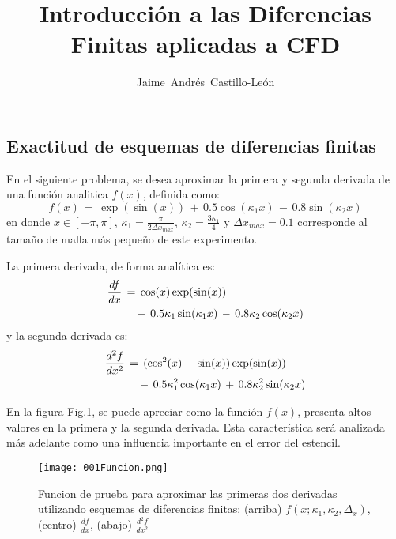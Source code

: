 \documentclass[9pt,technote,twoside,letterpaper,onecolumn]{IEEEtran}
\title{Introducción a las Diferencias Finitas aplicadas a CFD}
\author{Jaime~Andrés~Castillo-León}
\begin{document}
\begin{multicols}{2}
\maketitle



\section{Exactitud de esquemas de diferencias finitas}
\label{sec:exac}
En el siguiente problema, se desea aproximar la primera y segunda derivada de una función analitica $f(x)$,  definida como:
\begin{equation}
  f(x)\,=\,\exp(\sin(x))\,+\,0.5\cos(\kappa_1x)\,-\,0.8\sin(\kappa_2x)
  \label{eq:fun}
\end{equation}
en donde $x\in[-\pi,\pi]$, $\kappa_1 = \frac{\pi}{2\Delta x_{max}}$, $\kappa_2 = \frac{3\kappa_1}{4}$ y $\Delta x_{max}=0.1$ corresponde al tamaño de malla más pequeño de este experimento.

La primera derivada, de forma analítica es:
\begin{align}
  \frac{df}{dx}\,&=\,\cos(x)\exp(\sin(x))\notag\\
&\quad-\,0.5\kappa_1\sin(\kappa_1x)\,-\,0.8\kappa_2\cos(\kappa_2x)
  \label{eq:dfun}
\end{align}
y la segunda derivada es:
\begin{align}
  \frac{d^2f}{dx^2}\,&=\,(\cos^2(x)-\,\sin(x))\exp(\sin(x))\notag\\
&\quad-\,0.5\kappa^2_1\cos(\kappa_1x)\,+\,0.8\kappa^2_2\sin(\kappa_2x)
  \label{eq:d2fun}
\end{align}

En la figura Fig.\ref{fig:funx}, se puede apreciar como la función $f(x)$, presenta altos valores en la primera y la segunda derivada. Esta característica será analizada más adelante como una influencia importante en el error del estencil.
\begin{figure}[H]
  \centering
  \texttt{[image: 001Funcion.png]}\\
  \label{fig:funx}
  \caption{Funcion de prueba para aproximar las primeras dos derivadas utilizando esquemas de diferencias finitas: (arriba) $f(x;\kappa_1,\kappa_2,\Delta_x)$, (centro) $\frac{df}{dx}$, (abajo) $\frac{d^2f}{dx^2}$}
\end{figure}


\end{multicols}
\end{document}
